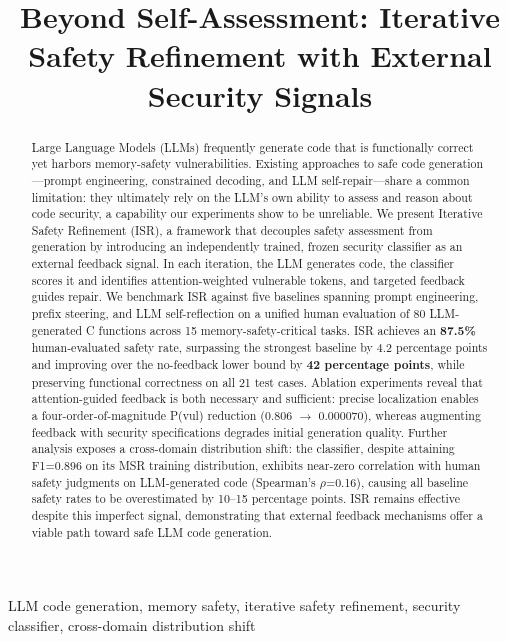 \documentclass[10pt,conference]{IEEEtran}
\begin{document}
\title{Beyond Self-Assessment: Iterative Safety Refinement with External Security Signals}

\author{}
\maketitle

\begin{abstract}
Large Language Models (LLMs) frequently generate code that is functionally correct yet harbors memory-safety vulnerabilities. Existing approaches to safe code generation---prompt engineering, constrained decoding, and LLM self-repair---share a common limitation: they ultimately rely on the LLM's own ability to assess and reason about code security, a capability our experiments show to be unreliable. We present Iterative Safety Refinement (ISR), a framework that decouples safety assessment from generation by introducing an independently trained, frozen security classifier as an external feedback signal. In each iteration, the LLM generates code, the classifier scores it and identifies attention-weighted vulnerable tokens, and targeted feedback guides repair. We benchmark ISR against five baselines spanning prompt engineering, prefix steering, and LLM self-reflection on a unified human evaluation of 80 LLM-generated C functions across 15 memory-safety-critical tasks. ISR achieves an \textbf{87.5\%} human-evaluated safety rate, surpassing the strongest baseline by 4.2 percentage points and improving over the no-feedback lower bound by \textbf{42 percentage points}, while preserving functional correctness on all 21 test cases. Ablation experiments reveal that attention-guided feedback is both necessary and sufficient: precise localization enables a four-order-of-magnitude P(vul) reduction (0.806 $\rightarrow$ 0.000070), whereas augmenting feedback with security specifications degrades initial generation quality. Further analysis exposes a cross-domain distribution shift: the classifier, despite attaining F1=0.896 on its MSR training distribution, exhibits near-zero correlation with human safety judgments on LLM-generated code (Spearman's $\rho$=0.16), causing all baseline safety rates to be overestimated by 10--15 percentage points. ISR remains effective despite this imperfect signal, demonstrating that external feedback mechanisms offer a viable path toward safe LLM code generation.
\end{abstract}

\begin{IEEEkeywords}
LLM code generation, memory safety, iterative safety refinement, security classifier, cross-domain distribution shift
\end{IEEEkeywords}
\end{document}
